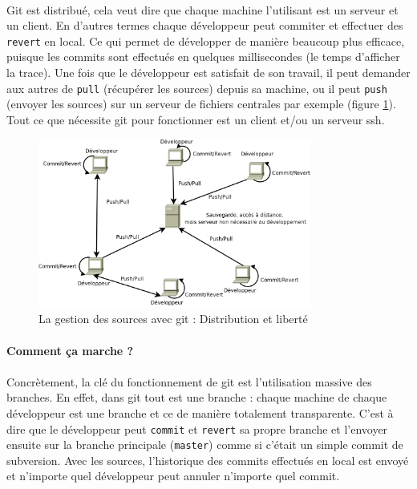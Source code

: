 \paragraph{}Git est distribué, cela veut dire que chaque machine l'utilisant est un serveur et un client. En d'autres termes chaque développeur peut commiter et effectuer des \verb|revert| en local. Ce qui permet de développer de manière beaucoup plus efficace, puisque les commits sont effectués en quelques millisecondes (le temps d'afficher la trace). Une fois que le développeur est satisfait de son travail, il peut demander aux autres de \verb|pull| (récupérer les sources) depuis sa machine, ou il peut \verb|push| (envoyer les sources) sur un serveur de fichiers centrales par exemple (figure \ref{git}). Tout ce que nécessite git pour fonctionner est un client et/ou un serveur ssh.


\begin{figure}[H]
\begin{center}
        \includegraphics[width=0.8\textwidth]{../images/git.png}
\caption{La gestion des sources avec git : Distribution et liberté}
\label{git}
\end{center}
\end{figure}




\paragraph{Comment ça marche ?} 
\paragraph{}Concrètement, la clé du fonctionnement de git est l'utilisation massive des branches. En effet, dans git tout est une branche : chaque machine de chaque développeur est une branche et ce de manière totalement transparente. C'est à dire que le développeur peut \verb|commit| et \verb|revert| sa propre branche et l'envoyer ensuite sur la branche principale (\verb|master|) comme si c'était un simple commit de subversion. Avec les sources, l'historique des commits effectués en local est envoyé et n'importe quel développeur peut annuler n'importe quel commit. 

